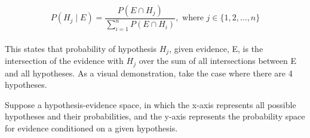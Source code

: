 \documentclass[12pt]{article}
\begin{document}
\begin{equation}
P(H_j \mid E) = \frac{P(E \cap H_j)}{\sum_{i=1}^{n} P(E \cap H_i)}, \text{ where } j \in \{1, 2, \ldots, n\}
\end{equation} \\

\noindent This states that probability of hypothesis $H_j$, given evidence, E,  is the intersection of the evidence with $H_j$ over the sum of all intersections between E and all hypotheses. As a visual demonstration, take the case where there are 4 hypotheses.

\newpage

\noindent Suppose a hypothesis-evidence space, in which the x-axis represents all possible hypotheses and their probabilities, and the y-axis represents the probability space for evidence conditioned on a given hypothesis.
\end{document}
